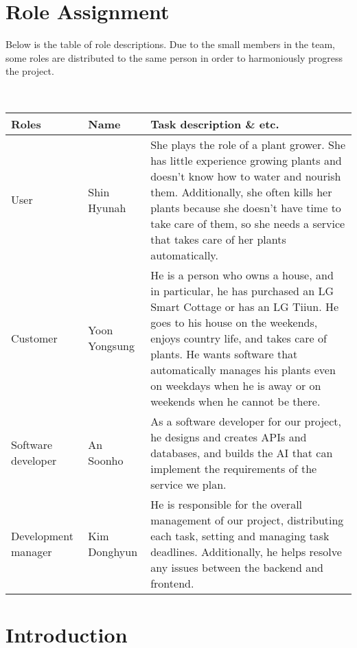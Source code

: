 \documentclass[conference, a4paper]{IEEEtran}
\begin{document}
\section{Role Assignment}
Below is the table of role descriptions. Due to the small
members in the team, some roles are distributed to the same
person in order to harmoniously progress the project.
\begin{table}[h]
\setlength{\tabcolsep}{12pt}
\renewcommand{\arraystretch}{1.5}
\\
\begin{tabular}{p{1.3cm} l p{3.2cm}} \hline
\toprule
Roles & Name & Task description \& etc.\\ \hline
\midrule
User & Shin Hyunah & 
She plays the role of a plant grower.
She has little experience growing plants and doesn't know how to water and nourish them.
Additionally, she often kills her plants because she doesn't have time to take care of them,
so she needs a service that takes care of her plants automatically.\\

Customer & Yoon Yongsung & He is a person who owns a house, and in particular, he has purchased an LG Smart Cottage or has an LG Tiiun. He goes to his house on the weekends, enjoys country life, and takes care of plants. He wants software that automatically manages his plants even on weekdays when he is away or on weekends when he cannot be there.\\
Software developer & An Soonho & As a software developer for our project, he designs and creates APIs and databases, and builds the AI that can implement the requirements of the service we plan.\\
Development manager & Kim Donghyun & He is responsible for the overall management of our project, distributing each task, setting and managing task deadlines. Additionally, he helps resolve any issues between the backend and frontend. \\ 
\bottomrule
\hline
\end{tabular}
\end{table}
\newpage

\section{Introduction}
\end{document}
